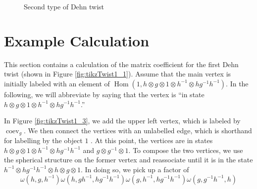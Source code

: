 \documentclass{amsart}
\DeclareMathOperator{\Hom}{Hom}
\DeclareMathOperator{\coev}{coev}
\begin{document}
\begin{figure}
    \centering
    \caption{Second type of Dehn twist}
    \label{fig:tikzTwist2_5}
\end{figure}

\section{Example Calculation}
This section contains a calculation of the matrix coefficient for the first Dehn twist (shown in Figure \ref{fig:tikzTwist1_1}).   Assume that the main vertex is initially labeled with an element of $\Hom(1, h \otimes g \otimes 1 \otimes h^{-1} \otimes hg^{-1}h^{-1})$.   In the following, we will abbreviate by saying that the vertex is ``in state $h \otimes g \otimes 1 \otimes h^{-1} \otimes hg^{-1}h^{-1}$.''

In Figure \ref{fig:tikzTwist1_3}, we add the upper left vertex, which is labeled by  $\coev_g$.  We then connect the vertices with an unlabelled edge, which is shorthand for labelling by the object $1$ .  At this point, the vertices are in states $h \otimes g \otimes 1 \otimes h^{-1} \otimes hg^{-1}h^{-1}$ and $g \otimes g^{-1}  \otimes 1$.  To compose the two vertices, we use the spherical structure on the former vertex and reassociate until it is in the state $h^{-1} \otimes h g^{-1} h^{-1} \otimes h \otimes g \otimes 1$.  In doing so, we pick up a factor of 
$$ \omega(h, g, h^{-1}) \omega(h, gh^{-1}, hg^{-1}h^{-1}) \omega(g, h^{-1}, hg^{-1}h^{-1}) \omega(g, g^{-1}h^{-1}, h) $$
\end{document}
